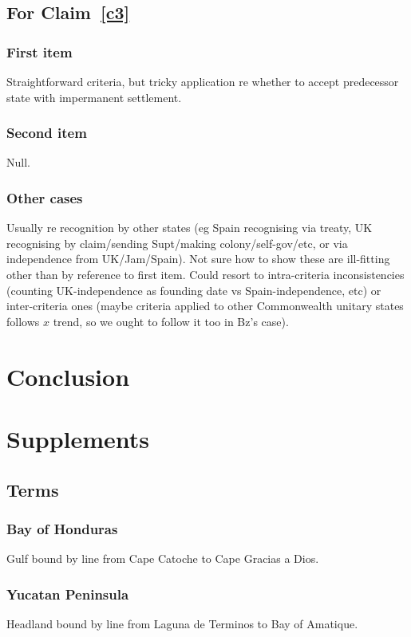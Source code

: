\documentclass{amsart}
\theoremstyle{definition}%
\theoremstyle{definition}%
\begin{document}
\subsection{For Claim~\ref{c3}}
\subsubsection{First item} Straightforward criteria, but tricky application re whether to accept predecessor state with impermanent settlement.
\subsubsection{Second item} Null.
\subsubsection{Other cases} Usually re recognition by other states (eg Spain recognising via treaty, UK recognising by claim/sending Supt/making colony/self-gov/etc, or via independence from UK/Jam/Spain). Not sure how to show these are ill-fitting other than by reference to first item. Could resort to intra-criteria inconsistencies (counting UK-independence as founding date vs Spain-independence, etc) or inter-criteria ones (maybe criteria applied to other Commonwealth unitary states follows \(x\) trend, so we ought to follow it too in Bz's case).
%
%
%
%
\newpage%
\section{Conclusion}
\label{s:concl}
\lipsum[1][1-6]
%
%
%
%
\section{Supplements}
\label{s:supp}
\lipsum[1][1-6]
%
%
%
%
\subsection{Terms}%
\label{ss:terms}
\subsubsection{Bay of Honduras} Gulf bound by line from Cape Catoche to Cape Gracias a Dios.
\subsubsection{Yucatan Peninsula} Headland bound by line from Laguna de Terminos to Bay of Amatique.
%
%
%
%
\end{document}
